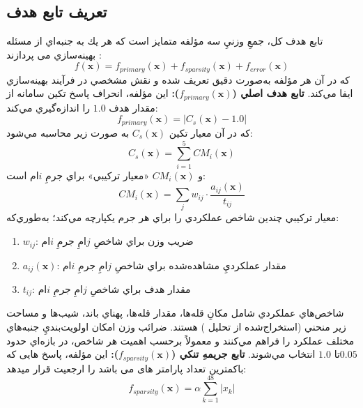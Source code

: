 \subsection{تعریف تابع هدف}
تابع هدف كل، جمعِ وزنيِ سه مؤلفه متمايز است كه هر يك به جنبه‌اي از مسئله بهينه‌سازي می پردازند :
\begin{equation}\label{Eq.objective_function_detailed}
f(\mathbf{x}) = f_{primary}(\mathbf{x}) + f_{sparsity}(\mathbf{x}) + f_{error}(\mathbf{x})
\end{equation}
كه در آن هر مؤلفه به‌صورت دقيق تعريف شده و نقش مشخصي در فرآيند بهينه‌سازي ايفا مي‌كند.
\textbf{تابع هدف اصلي ($f_{primary}(\mathbf{x})$):} اين مؤلفه، انحراف پاسخ تكين سامانه از مقدار هدف $1.0$ را اندازه‌گيري مي‌كند:
\begin{equation}\label{Eq.primary_objective_detailed}
f_{primary}(\mathbf{x}) = \left| C_s(\mathbf{x}) - 1.0 \right|
\end{equation}
كه در آن معيار تكين $C_s(\mathbf{x})$ به صورت زير محاسبه مي‌شود:
\begin{equation}\label{Eq.singular_response_detailed}
C_s(\mathbf{x}) = \sum_{i=1}^{5} CM_i(\mathbf{x})
\end{equation}
و $CM_i(\mathbf{x})$ «معيار تركيبي» براي جرمِ $i$ام است:
\begin{equation}\label{Eq.composite_measure_detailed}
CM_i(\mathbf{x}) = \sum_{j} w_{ij} \cdot \frac{a_{ij}(\mathbf{x})}{t_{ij}}
\end{equation}
معيار تركيبي چندين شاخص عملكردي را براي هر جرم يكپارچه مي‌كند؛ به‌طوري‌كه:
\begin{enumerate}
    \item $w_{ij}$: ضريب وزن براي شاخصِ $j$امِ جرمِ $i$ام
    \item $a_{ij}(\mathbf{x})$: مقدار عملكرديِ مشاهده‌شده براي شاخصِ $j$امِ جرمِ $i$ام
    \item $t_{ij}$: مقدار هدف براي شاخصِ $j$امِ جرمِ $i$ام
\end{enumerate}
شاخص‌هاي عملكردي شامل مكانِ قله‌ها، مقدار قله‌ها، پهناي باند، شيب‌ها و مساحت زير منحني (استخراج‌شده از تحليل ) هستند. ضرائب وزن امكان اولويت‌بنديِ جنبه‌هاي مختلف عملكرد را فراهم مي‌كنند و معمولاً برحسب اهميت هر شاخص، در بازه‌اي حدود $0.05 $تا $1.0$ انتخاب مي‌شوند.
\textbf{تابع جريمهِ تنكي ($f_{sparsity}(\mathbf{x})$):} اين مؤلفه، پاسخ هایی که باکمترین تعداد پارامتر های  می باشد را ارجعیت قرار میدهد:
\begin{equation}\label{Eq.sparsity_penalty_detailed}
f_{sparsity}(\mathbf{x}) = \alpha \sum_{k=1}^{48} |x_k|
\end{equation}
